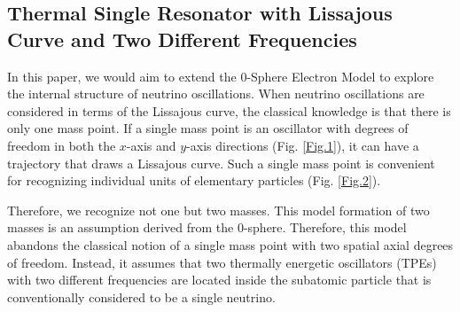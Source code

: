 \documentclass[%
 reprint,
 amsmath,amssymb,
 aps,
]{revtex4-1}
\numberwithin{equation}{section}%
\begin{document}




\subsection{Thermal Single Resonator with Lissajous Curve and Two Different Frequencies}



In this paper, we would aim to extend the 0-Sphere Electron Model to explore the internal structure of neutrino oscillations. When neutrino oscillations are considered in terms of the Lissajous curve, the classical knowledge is that there is only one mass point. If a single mass point is an oscillator with degrees of freedom in both the $x$-axis and $y$-axis directions (Fig. \ref{Fig.1}), it can have a trajectory that draws a Lissajous curve. Such a single mass point is convenient for recognizing individual units of elementary particles (Fig. \ref{Fig.2}).

Therefore, we recognize not one but two masses. This model formation of two masses is an assumption derived from the 0-sphere. Therefore, this model abandons the classical notion of a single mass point with two spatial axial degrees of freedom. Instead, it assumes that two thermally energetic oscillators (TPEs) with two different frequencies are located inside the subatomic particle that is conventionally considered to be a single neutrino.
\end{document}
